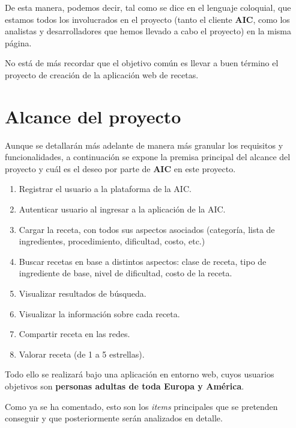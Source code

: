 \documentclass{\ClassPath/viu-tfm-template}
\begin{document}
De esta manera, podemos decir, tal como se dice en el lenguaje coloquial, que estamos todos los involucrados en el proyecto (tanto el cliente \textbf{AIC}, como los analistas y desarrolladores que hemos llevado a cabo el proyecto) en la misma página.

No está de más recordar que el objetivo común es llevar a buen término el proyecto de creación de la aplicación web de recetas.

\section{Alcance del proyecto}
Aunque se detallarán más adelante de manera más granular los requisitos y funcionalidades, a continuación se expone la premisa principal del alcance del proyecto y cuál es el deseo por parte de \textbf{AIC} en este proyecto.

\begin{enumerate}[label=\alph*)]
    \item Registrar el usuario a la plataforma de la AIC.
    \item Autenticar usuario al ingresar a la aplicación de la AIC.
    \item Cargar la receta, con todos sus aspectos asociados (categoría, lista de
    ingredientes, procedimiento, dificultad, costo, etc.)
    \item Buscar recetas en base a distintos aspectos: clase de receta, tipo de ingrediente
    de base, nivel de dificultad, costo de la receta.
    \item Visualizar resultados de búsqueda.
    \item Visualizar la información sobre cada receta.
    \item Compartir receta en las redes.
    \item Valorar receta (de 1 a 5 estrellas).
\end{enumerate}

Todo ello se realizará bajo una aplicación en entorno web, cuyos usuarios objetivos son \textbf{personas adultas de toda Europa y América}.


Como ya se ha comentado, esto son los \textit{items} principales que se pretenden conseguir y que posteriormente serán analizados en detalle.


\end{document}
